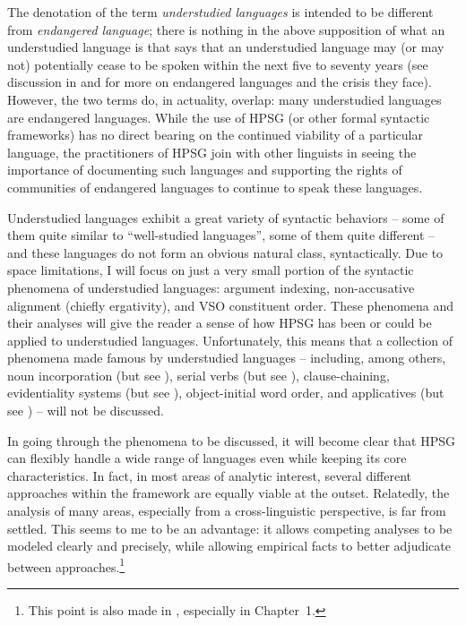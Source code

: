 \documentclass[output=paper,biblatex,babelshorthands,newtxmath,draftmode,colorlinks,citecolor=brown]{langscibook}
\begin{document}
The denotation of the term \textit{understudied languages} is intended to be different from \textit{endangered language}; there is nothing in the above supposition of what an understudied language is that says that an understudied language may (or may not) potentially cease to be spoken within the next five to seventy years (see discussion in \citealt{krauss92} and \citealt{SL13} for more on endangered languages and the crisis they face).  However, the two terms do, in actuality, overlap: many understudied languages are endangered languages. While the use of HPSG (or other formal syntactic frameworks) has no direct bearing on the continued viability of a particular language, the practitioners of HPSG join with other linguists in seeing the importance of documenting such languages and supporting the rights of communities of endangered languages to continue to speak these languages.       

\largerpage
Understudied languages exhibit a great variety of syntactic behaviors -- some of them quite similar to ``well-studied languages'', some of them quite different -- and these languages do not form an obvious natural class, syntactically. Due to space limitations, I will focus on just a very small portion of the syntactic phenomena of understudied languages: argument indexing, non-accusative alignment (chiefly ergativity), and VSO constituent order. These phenomena and their analyses will give the reader a sense of how HPSG has been or could be applied to understudied languages. Unfortunately, this means that a collection of phenomena made famous by understudied languages -- including, among others, noun incorporation (but see \citealt{malouf99,runara03,ball05afla,ball05hpsg,ball08thesis}), serial verbs (but see \citealt{muansuwan01,muansuwan02,KDHB2007a,ML2009a,lee14}), clause-chaining, evidentiality systems (but see \citealt{lee12}), object-initial word order, and applicatives (but see \citealt{runara03,ball08thesis,ball10}) -- will not be discussed.

In going through the phenomena to be discussed, it will become clear that HPSG can flexibly handle a wide range of languages even while keeping its core characteristics. In fact, in most areas of analytic interest, several different approaches within the framework are equally viable at the outset. Relatedly, the analysis of many areas, especially from a cross-linguistic perspective, is far from settled. This seems to me to be an advantage: it allows competing analyses to be modeled clearly and precisely, while allowing empirical facts to better adjudicate between approaches.\footnote{This point is also made in \citet{fokkens14}, especially in Chapter~1.}
\end{document}
